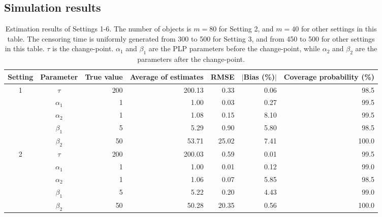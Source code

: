 \documentclass[12pt]{article}
\numberwithin{equation}{section}
\begin{document}
\subsection{Simulation results}
\begin{table}[htp]
	\label{tab1}
	\centering
	\caption{Estimation results of Settings 1-6. The number of objects is $m=80$ for Setting 2, and $m=40$ for other settings in this table.
		The censoring time is uniformly generated from 300 to 500 for Setting 3, and  from 450 to 500 for other settings in this table. $\tau$ is the change-point.  $\alpha_1$ and $\beta_1$ are 
		the PLP parameters before the change-point, while $\alpha_2$ and $\beta_2$ are the parameters after the change-point.}
	\begin{tabular}{ccrrrrr}
		\hline
		\multicolumn{1}{c}{Setting} & \multicolumn{1}{c}{Parameter} & \multicolumn{1}{p{2em}}{True value} & \multicolumn{1}{p{4.8em}}{Average of  estimates} & \multicolumn{1}{c}{RMSE} & \multicolumn{1}{c}{$|$Bias (\%)$|$} & \multicolumn{1}{p{4.8em}}{Coverage probability (\%) } \\
		\hline
		\multirow{5}[2]{*}{1}
		& $\tau$			  & 200   & 200.13 & 0.33  & 0.06 & 98.5 \\
		& $\alpha_1$			          & 1     & 1.00     & 0.03  & 0.27  & 99.5 \\
		& $\alpha_2$			             & 1     & 1.08  & 0.15  & 8.10   & 99.5 \\
		& $\beta_1$			                & 5     & 5.29  & 0.90   & 5.80   & 98.5 \\
		& $\beta_2$			                 & 50    & 53.71 & 25.02 & 7.41  & 100.0 \\
		
		\hline
		\multirow{5}[2]{*}{2} 
		& $\tau$			      & 200   & 200.03 & 0.59  & 0.01 & 99.5 \\
		& $\alpha_1$			                & 1     & 1.00     & 0.01  & 0.12  & 99.0 \\
		& $\alpha_2$			               & 1     & 1.06 & 0.07  & 5.85  & 98.5 \\
		& $\beta_1$			              & 5     & 5.22  & 0.20   & 4.43  & 99.0 \\
		& $\beta_2$			              & 50    & 50.28 & 20.35 & 0.56  & 100.0 \\
		

\end{tabular}
\end{table}
\end{document}
